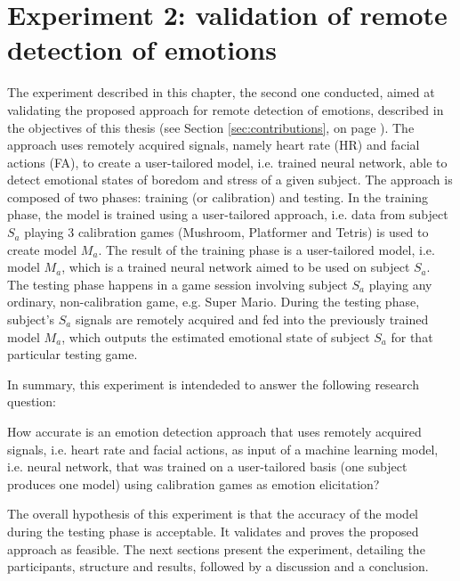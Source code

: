 \chapter{Experiment 2: validation of remote detection of emotions}
\label{ch:experiment2}

The experiment described in this chapter, the second one conducted, aimed at validating the proposed approach for remote detection of emotions, described in the objectives of this thesis (see Section \ref{sec:contributions}, on page \pageref{sec:contributions}). The approach uses remotely acquired signals, namely heart rate (HR) and facial actions (FA), to create a user-tailored model, i.e. trained neural network, able to detect emotional states of boredom and stress of a given subject. The approach is composed of two phases: training (or calibration) and testing. In the training phase, the model is trained using a user-tailored approach, i.e. data from subject $S_a$ playing 3 calibration games (Mushroom, Platformer and Tetris) is used to create model $M_a$. The result of the training phase is a user-tailored model, i.e. model $M_a$, which is a trained neural network aimed to be used on subject $S_a$. The testing phase happens in a game session involving subject $S_a$ playing any ordinary, non-calibration game, e.g. Super Mario. During the testing phase, subject's $S_a$ signals are remotely acquired and fed into the previously trained model $M_a$, which outputs the estimated emotional state of subject $S_a$ for that particular testing game.

In summary, this experiment is intendeded to answer the following research question:

\begin{fquote}
How accurate is an emotion detection approach that uses remotely acquired signals, i.e. heart rate and facial actions, as input of a machine learning model, i.e. neural network, that was trained on a user-tailored basis (one subject produces one model) using calibration games as emotion elicitation?
\end{fquote}

The overall hypothesis of this experiment is that the accuracy of the model during the testing phase is acceptable. It validates and proves the proposed approach as feasible. The next sections present the experiment, detailing the participants, structure and results, followed by a discussion and a conclusion.

